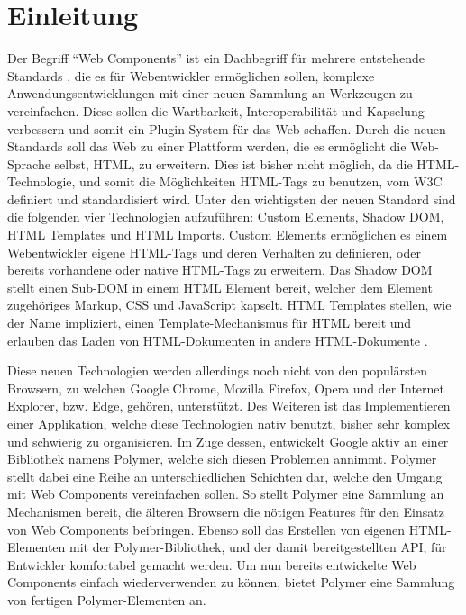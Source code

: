 \chapter{Einleitung}\label{einleitung}

Der Begriff ``Web Components'' ist ein Dachbegriff für mehrere
entstehende Standards \cite{citeulike:13844988}, die es für
Webentwickler ermöglichen sollen, komplexe Anwendungsentwicklungen mit
einer neuen Sammlung an Werkzeugen zu vereinfachen. Diese sollen die
Wartbarkeit, Interoperabilität und Kapselung verbessern und somit ein
Plugin-System für das Web schaffen. Durch die neuen Standards soll das
Web zu einer Plattform werden, die es ermöglicht die Web-Sprache selbst,
HTML, zu erweitern. Dies ist bisher nicht möglich, da die
HTML-Technologie, und somit die Möglichkeiten HTML-Tags zu benutzen, vom
W3C definiert und standardisiert wird. Unter den wichtigsten der neuen
Standard sind die folgenden vier Technologien aufzuführen: Custom
Elements, Shadow DOM, HTML Templates und HTML Imports. Custom Elements
ermöglichen es einem Webentwickler eigene HTML-Tags und deren Verhalten
zu definieren, oder bereits vorhandene oder native HTML-Tags zu
erweitern. Das Shadow DOM stellt einen Sub-DOM in einem HTML Element
bereit, welcher dem Element zugehöriges Markup, CSS und JavaScript
kapselt. HTML Templates stellen, wie der Name impliziert, einen
Template-Mechanismus für HTML bereit \cite{citeulike:13842702} und
erlauben das Laden von HTML-Dokumenten in andere HTML-Dokumente
\cite{citeulike:13842701}.

Diese neuen Technologien werden allerdings noch nicht von den
populärsten Browsern, zu welchen Google Chrome, Mozilla Firefox, Opera
und der Internet Explorer, bzw. Edge, gehören, unterstützt. Des Weiteren
ist das Implementieren einer Applikation, welche diese Technologien
nativ benutzt, bisher sehr komplex und schwierig zu organisieren. Im
Zuge dessen, entwickelt Google aktiv an einer Bibliothek namens Polymer,
welche sich diesen Problemen annimmt. Polymer stellt dabei eine Reihe an
unterschiedlichen Schichten dar, welche den Umgang mit Web Components
vereinfachen sollen. So stellt Polymer eine Sammlung an Mechanismen
bereit, die älteren Browsern die nötigen Features für den Einsatz von
Web Components beibringen. Ebenso soll das Erstellen von eigenen
HTML-Elementen mit der Polymer-Bibliothek, und der damit
bereitgestellten API, für Entwickler komfortabel gemacht werden. Um nun
bereits entwickelte Web Components einfach wiederverwenden zu können,
bietet Polymer eine Sammlung von fertigen Polymer-Elementen an.

